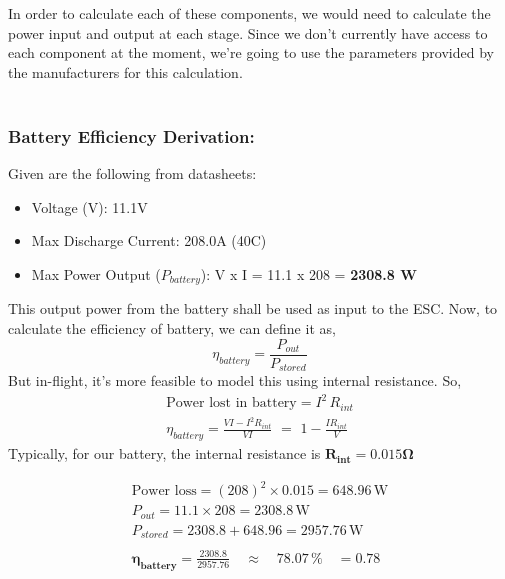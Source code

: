 \documentclass[12pt]{report}
\begin{document}
      In order to calculate each of these components, we would need to calculate the power input and output at each stage. Since we don't currently have access to each component at the moment, we're going to use the parameters provided by the manufacturers for this calculation. \\ \\
      \subsubsection{\large Battery Efficiency Derivation:}
      Given are the following from datasheets:
      \begin{itemize}
        \item Voltage (V): \hfill 11.1V
        \item Max Discharge Current: \hfill 208.0A (40C)
        \item Max Power Output ($ P_{battery} $): \hfill V x I = 11.1 x 208 = \textbf{2308.8 W}
      \end{itemize}
      This output power from the battery shall be used as input to the ESC. Now, to calculate the efficiency of battery, we can define it as, \[ \eta_{battery} = \frac{P_{out}}{P_{stored}} \] But in-flight, it's more feasible to model this using internal resistance. So, 
      \begin{gather*}
        \text{Power lost in battery} = I^2 \, R_{int} \\
        \eta_{battery} = \frac{VI - I^2 R_{int}}{VI} \,\, = \,\, 1 - \frac{IR_{int}}{V}
    \end{gather*}
    Typically, for our battery, the internal resistance is $ \boldsymbol{R_{int} = 0.015 \Omega} $

    \begin{gather*}
      \text{Power loss} = (208)^2 \times 0.015 = 648.96 \, \text{W} \\
      P_{out} = 11.1 \times 208 = 2308.8 \, \text{W} \\
      P_{stored} = 2308.8 + 648.96 = 2957.76 \, \text{W} \\ \\
      \boldsymbol{\eta_{battery}} = \frac{2308.8}{2957.76} \quad \approx \quad 78.07\, \% \quad = \boldsymbol{0.78}
    \end{gather*}
\end{document}
